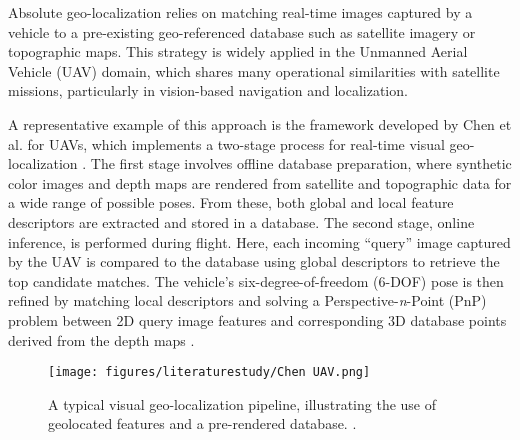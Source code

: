 \noindent
Absolute geo-localization relies on matching real-time images captured by a vehicle to a pre-existing geo-referenced database such as satellite imagery or topographic maps. This strategy is widely applied in the Unmanned Aerial Vehicle (UAV) domain, which shares many operational similarities with satellite missions, particularly in vision-based navigation and localization.
\vspace{0.5cm}

\noindent
A representative example of this approach is the framework developed by Chen et al. for UAVs, which implements a two-stage process for real-time visual geo-localization \cite{Chen2021}. The first stage involves offline database preparation, where synthetic color images and depth maps are rendered from satellite and topographic data for a wide range of possible poses. From these, both global and local feature descriptors are extracted and stored in a database. The second stage, online inference, is performed during flight. Here, each incoming ``query'' image captured by the UAV is compared to the database using global descriptors to retrieve the top candidate matches. The vehicle's six-degree-of-freedom (6-DOF) pose is then refined by matching local descriptors and solving a Perspective-\textit{n}-Point (PnP) problem between 2D query image features and corresponding 3D database points derived from the depth maps \cite{Chen2021}.

\begin{figure}[H]
    \centering
    \texttt{[image: figures/literaturestudy/Chen UAV.png]}
    \caption{A typical visual geo-localization pipeline, illustrating the use of geolocated features and a pre-rendered database. \cite{Chen2021}.}
    \label{fig:visual_pipeline}
\end{figure}

